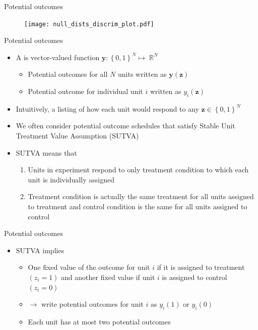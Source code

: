 \documentclass[table, xcolor = {dvipsnames}, 9pt]{beamer}
\theoremstyle{plain}
\newcommand{\mh}[1]{{\color{magenta}{#1}}}
\DeclareMathOperator{\R}{\mathbb{R}}
\begin{document}
\begin{frame}{Potential outcomes}
\vfill
\begin{figure}[H]
\texttt{[image: null\_dists\_discrim\_plot.pdf]}
\end{figure} \vfill
\end{frame}
\begin{frame}{Potential outcomes}
\vfill
\begin{itemize} \vfill
\item A \mh{potential outcome schedule} is vector-valued function $\bm{y}: \left\{0, 1\right\}^N \mapsto \R^N$ \vfill
\begin{itemize} \vfill
\item Potential outcomes for all $N$ units written as $\bm{y}(\bm{z})$ \vfill
\item Potential outcome for individual unit $i$ written as $y_i(\bm{z})$ \vfill
\end{itemize} \vfill
\item Intuitively, a listing of how each unit would respond to any $\bm{z} \in \left\{0, 1\right\}^N$ \vfill
\item We often consider potential outcome schedules that satisfy Stable Unit Treatment Value Assumption (SUTVA) \citep{cox1958a,rubin1980b,rubin1986} \vfill
\item SUTVA means that \vfill
\begin{enumerate} \vfill
\item Units in experiment respond to only treatment condition to which each unit is individually assigned \vfill
\item Treatment condition is actually the same treatment for all units assigned to treatment and control condition is the same for all units assigned to control \vfill
\end{enumerate} \vfill
\end{itemize}  
\vfill
\end{frame}
\begin{frame}{Potential outcomes}
\vfill
\begin{itemize} \vfill
\item SUTVA implies \vfill
\begin{itemize} \vfill
\item One fixed value of the outcome for unit $i$ if it is assigned to treatment $(z_i = 1)$ and another fixed value if unit $i$ is assigned to control $(z_i = 0)$ \vfill
\item[] $\rightarrow$ write potential outcomes for unit $i$ as $y_i(1)$ or $y_i(0)$ \vfill 
\item Each unit has at most two potential outcomes \vfill
\end{itemize} \vfill 
\end{itemize} 
\vfill
\end{frame}
\end{document}
